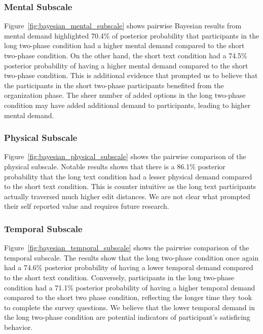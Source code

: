 \subsubsection{Mental Subscale}
Figure~\ref{fig:bayesian_mental_subscale} shows pairwise Bayesian results from mental demand highlighted 70.4\% of posterior probability that participants in the long two-phase condition had a higher mental demand compared to the short two-phase condition. On the other hand, the short text condition had a 74.5\% posterior probability of having a higher mental demand compared to the short two-phase condition. This is additional evidence that prompted us to believe that the participants in the short two-phase participants benefited from the organization phase. The sheer number of added options in the long two-phase condition may have added additional demand to participants, leading to higher mental demand.

\subsubsection{Physical Subscale}
Figure~\ref{fig:bayesian_physical_subscale} shows the pairwise comparison of the physical subscale. Notable results shows that there is a 86.1\% posterior probability that the long text condition had a lesser physical demand compared to the short text condition. This is counter intuitive as the long text participants actually traversed much higher edit distances. We are not clear what prompted their self reported value and requires future research. 

\subsubsection{Temporal Subscale}
\label{sec:temporal_subscale_bayesian}
Figure~\ref{fig:bayesian_temporal_subscale} shows the pairwise comparison of the temporal subscale. The results show that the long two-phase condition once again had a 74.6\% posterior probability of having a lower temporal demand compared to the short text condition. Conversely, participants in the long two-phase condition had a 71.1\% posterior probability of having a higher temporal demand compared to the short two phase condition, reflecting the longer time they took to complete the survey questions. We believe that the lower temporal demand in the long two-phase condition are potential indicators of participant's satisficing behavior.

